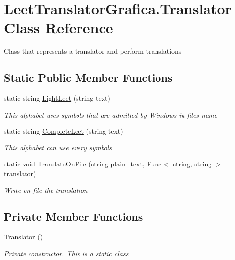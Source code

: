 \hypertarget{class_leet_translator_grafica_1_1_translator}{}\section{Leet\+Translator\+Grafica.\+Translator Class Reference}
\label{class_leet_translator_grafica_1_1_translator}


Class that represents a translator and perform translations  


\subsection*{Static Public Member Functions}
\begin{DoxyCompactItemize}
\item 
static string \mbox{\hyperlink{class_leet_translator_grafica_1_1_translator_a5f13acd40cb9def2c45b69f98bd8935d}{Light\+Leet}} (string text)
\begin{DoxyCompactList}\small\item\em This alphabet uses symbols that are admitted by Windows in files\textquotesingle{} name \end{DoxyCompactList}\item 
static string \mbox{\hyperlink{class_leet_translator_grafica_1_1_translator_a0538325327e6153ea9d9ed2abbcf04aa}{Complete\+Leet}} (string text)
\begin{DoxyCompactList}\small\item\em This alphabet can use every symbols \end{DoxyCompactList}\item 
static void \mbox{\hyperlink{class_leet_translator_grafica_1_1_translator_a703defc4c40ffed8c59117dbabea532c}{Translate\+On\+File}} (string plain\+\_\+text, Func$<$ string, string $>$ translator)
\begin{DoxyCompactList}\small\item\em Write on file the translation \end{DoxyCompactList}\end{DoxyCompactItemize}
\subsection*{Private Member Functions}
\begin{DoxyCompactItemize}
\item 
\mbox{\hyperlink{class_leet_translator_grafica_1_1_translator_aa672be9ffa2be49533832a54185a86c5}{Translator}} ()
\begin{DoxyCompactList}\small\item\em Private constructor. This is a static class \end{DoxyCompactList}\end{DoxyCompactItemize}

